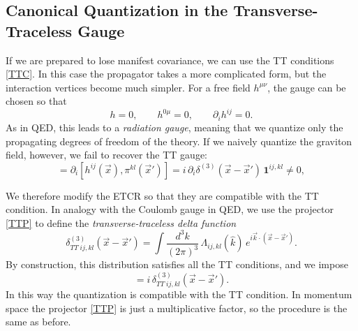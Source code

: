 \documentclass[12pt,a4paper,oneside]{article}
\numberwithin{equation}{section}   %
\begin{document}
\subsection{Canonical Quantization in the Transverse-Traceless Gauge}
If we are prepared to lose manifest covariance, we can use the TT conditions
\eqref{TTC}. In this case the propagator takes a more complicated form, but the
interaction vertices become much simpler.
For a free field $h^{\mu\nu}$, the gauge can be chosen so that
\begin{equation*}
    h=0,\qquad h^{0\mu}=0,\qquad \partial_i h^{ij}=0 .
\end{equation*}
As in QED, this leads to a \textit{radiation gauge}, meaning that we quantize
only the propagating degrees of freedom of the theory.
If we naively quantize the graviton field, however, we fail to recover the TT
gauge:
\begin{equation}
[\partial_i h^{ij}(\vec x),\pi^{kl}(\vec x')]
= \partial_i [h^{ij}(\vec x),\pi^{kl}(\vec x')]
= i\,\partial_i \delta^{(3)}(\vec{x}-\vec{x}')\,\mathbf{1}^{ij,kl}\neq 0 ,
\end{equation}

We therefore modify the ETCR so that they are compatible with the TT condition.
In analogy with the Coulomb gauge in QED, we use the projector \eqref{TTP} to
define the \textit{transverse-traceless delta function}
\begin{equation}\label{TTD}
    \delta^{(3)}_{TT\;ij,kl}(\vec{x}-\vec{x}')
    =\int\frac{d^3k}{(2\pi)^3}\,\Lambda_{ij,kl}(\hat k)\,
     e^{i\vec k\cdot(\vec x-\vec x')} .
\end{equation}
By construction, this distribution satisfies all the TT conditions, and we
impose
\begin{equation}
    [h_{ij}(\vec x,t),\pi_{kl}(\vec x',t)]= i\, \delta^{(3)}_{TT\;ij,kl}(\vec{x}-\vec{x}') .
\end{equation}
In this way the quantization is compatible with the TT condition. In momentum
space the projector \eqref{TTP} is just a multiplicative factor, so the
procedure is the same as before.
\end{document}
